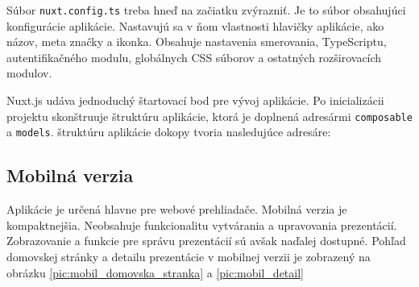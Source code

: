 Súbor \texttt{nuxt.config.ts} treba hneď na začiatku zvýrazniť. Je to súbor obsahujúci konfigurácie aplikácie. Nastavujú sa v ňom vlastnosti hlavičky aplikácie, ako názov, meta značky a ikonka. Obsahuje nastavenia smerovania, TypeScriptu, autentifikačného modulu, globálnych CSS súborov a ostatných rozširovacích modulov.

Nuxt.js udáva jednoduchý štartovací bod pre vývoj aplikácie. Po inicializácii projektu skonštruuje štruktúru aplikácie, ktorá je doplnená adresármi \texttt{composable} a \texttt{models}. štruktúru aplikácie dokopy tvoria nasledujúce adresáre:

\vspace{5mm}

\subsection*{Mobilná verzia}
Aplikácie je určená hlavne pre webové prehliadače. Mobilná verzia je kompaktnejšia. Neobsahuje funkcionalitu vytvárania a upravovania prezentácií. Zobrazovanie a funkcie pre správu prezentácií sú avšak naďalej dostupné. Pohľad domovskej stránky a detailu prezentácie v mobilnej verzii je zobrazený na obrázku \ref{pic:mobil_domovska_stranka} a \ref{pic:mobil_detail}

